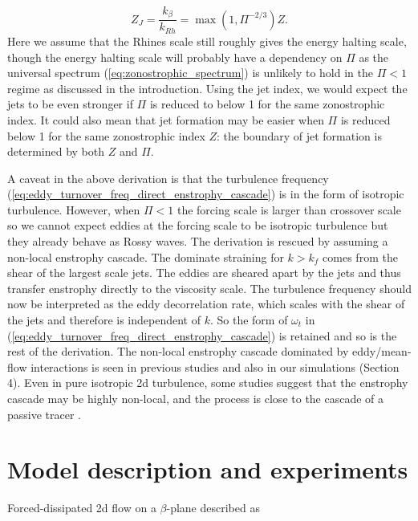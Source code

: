 \documentclass{ametsoc}
\begin{document}
\begin{equation}
Z_{J}=\frac{k_{\beta}}{k_{Rh}}=\max(1,\Pi^{-2/3})Z.\label{eq:jet index}
\end{equation}
Here we assume that the Rhines scale still roughly gives the energy
halting scale, though the energy halting scale will probably have a
dependency on $\Pi$ as the universal spectrum (\ref{eq:zonostrophic_spectrum})
is unlikely to hold in the $\Pi<1$ regime as discussed in the introduction. 
Using the jet index, we would
expect the jets to be even stronger if $\Pi$ is reduced to below 1 for
the same zonostrophic index. It could also mean that jet 
formation may be easier when $\Pi$ is reduced
below 1 for the same zonostrophic index $Z$: the boundary of jet
formation is determined by both $Z$ and $\Pi$. 

A caveat in the above derivation is that the turbulence frequency (\ref{eq:eddy_turnover_freq_direct_enstrophy_cascade})
is in the form of isotropic turbulence. However, when $\Pi<1$
the forcing scale is larger than crossover scale
so we cannot expect eddies at the forcing scale to be isotropic
turbulence but they already behave as Rossy waves.
The derivation is rescued by assuming a non-local
enstrophy cascade. The dominate straining for $k>k_{f}$ comes from
the shear of the largest scale jets. The eddies are sheared apart
by the jets and thus transfer enstrophy directly to the viscosity
scale. The turbulence frequency should now be interpreted as the eddy
decorrelation rate, which scales with the shear of the jets and therefore
is independent of $k$. So the form of $\omega_{t}$ in (\ref{eq:eddy_turnover_freq_direct_enstrophy_cascade})
is retained and so is the rest of the derivation. The non-local enstrophy
cascade dominated by eddy/mean-flow interactions is seen in previous
studies \citep{Manz2009} and also in our simulations (Section 4).
Even in pure isotropic 2d turbulence, some studies suggest that the enstrophy
cascade may be highly non-local, and the process is close to the cascade
of a passive tracer \citep{Borue1993,Falkovich1994}.


\section{Model description and experiments}

Forced-dissipated 2d flow on a $\beta$-plane described as
\end{document}
